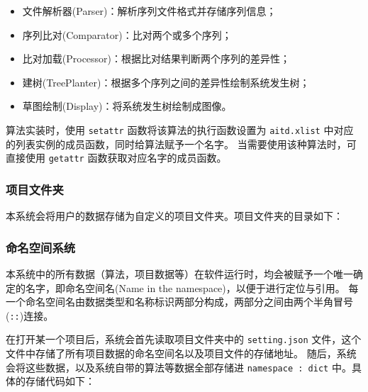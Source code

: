 \documentclass{article}
\begin{document}
\begin{multicols}{2}
\begin{itemize}
\item[1)] 文件解析器(Parser)：解析序列文件格式并存储序列信息；
\item[2)] 序列比对(Comparator)：比对两个或多个序列；
\item[3)] 比对加载(Processor)：根据比对结果判断两个序列的差异性；
\item[4)] 建树(TreePlanter)：根据多个序列之间的差异性绘制系统发生树；
\item[5)] 草图绘制(Display)：将系统发生树绘制成图像。
\end{itemize}

\par
算法实装时，使用 \verb|setattr| 函数将该算法的执行函数设置为 \verb|aitd.xlist| 中对应的列表实例的成员函数，同时给算法赋予一个名字。
当需要使用该种算法时，可直接使用 \verb|getattr| 函数获取对应名字的成员函数。

\subsubsection{项目文件夹}
\par
本系统会将用户的数据存储为自定义的项目文件夹。项目文件夹的目录如下：
\par
{}


\subsubsection{命名空间系统}
\par
本系统中的所有数据（算法，项目数据等）在软件运行时，均会被赋予一个唯一确定的名字，即命名空间名(Name in the namespace)，以便于进行定位与引用。
每一个命名空间名由数据类型和名称标识两部分构成，两部分之间由两个半角冒号(\verb|::|)连接。
\par
在打开某一个项目后，系统会首先读取项目文件夹中的 \verb|setting.json| 文件，这个文件中存储了所有项目数据的命名空间名以及项目文件的存储地址。
随后，系统会将这些数据，以及系统自带的算法等数据全部存储进 \verb|namespace : dict| 中。具体的存储代码如下：
\par
% 


\end{multicols}
\end{document}
